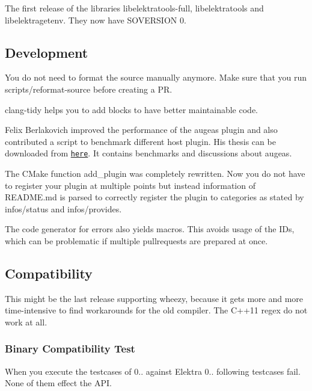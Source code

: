 The first release of the libraries libelektratools-\/full, libelektratools and libelektragetenv. They now have S\+O\+V\+E\+R\+S\+I\+ON 0.

\subsection*{Development}

You do not need to format the source manually anymore. Make sure that you run scripts/reformat-\/source before creating a PR.

{\ttfamily clang-\/tidy} helps you to add blocks to have better maintainable code.

Felix Berlakovich improved the performance of the augeas plugin and also contributed a script to benchmark different host plugin. His thesis can be downloaded from \href{https://www.libelektra.org/ftp/elektra/berlakovich2016universal.pdf}{\tt here}. It contains benchmarks and discussions about augeas.

The C\+Make function {\ttfamily add\+\_\+plugin} was completely rewritten. Now you do not have to register your plugin at multiple points but instead information of R\+E\+A\+D\+M\+E.\+md is parsed to correctly register the plugin to categories as stated by {\ttfamily infos/status} and {\ttfamily infos/provides}.

The code generator for errors also yields macros. This avoids usage of the I\+Ds, which can be problematic if multiple pullrequests are prepared at once.

\subsection*{Compatibility}

This might be the last release supporting wheezy, because it gets more and more time-\/intensive to find workarounds for the old compiler. The C++11 regex do not work at all.

\subsubsection*{Binary Compatibility Test}

When you execute the testcases of 0.. against Elektra 0.. following testcases fail. None of them effect the A\+PI.


